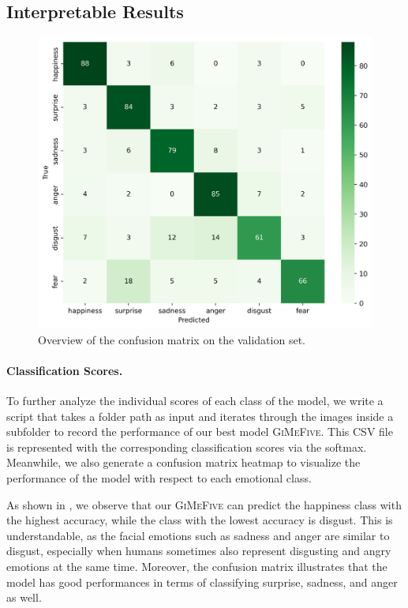 
\subsection{Interpretable Results}
\label{sec:evaluation:inter}

\begin{figure}[ht]
  \centering
   \includegraphics[width=\linewidth]{matval.png}
   \caption{Overview of the confusion matrix on the validation set.} 
   \label{fig:matval}
\end{figure}

\paragraph{Classification Scores.} 
To further analyze the individual scores of each class of the model, 
we write a script that takes a folder path as input and iterates through the images inside a subfolder to record the performance of our best model \textsc{GiMeFive}. 
This CSV file is represented with the corresponding classification scores via the softmax. 
Meanwhile, 
we also generate a confusion matrix heatmap to visualize the performance of the model with respect to each emotional class.

As shown in , 
we observe that our \textsc{GiMeFive} can predict the happiness class with the highest accuracy, 
while the class with the lowest accuracy is disgust. 
This is understandable, 
as the facial emotions such as sadness and anger are similar to disgust, 
especially when humans sometimes also represent disgusting and angry emotions at the same time. 
Moreover, 
the confusion matrix illustrates that the model has good performances in terms of classifying surprise, sadness, and anger as well. 



